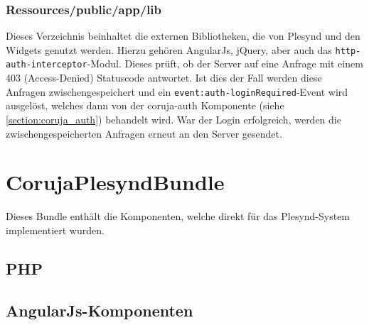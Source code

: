 \subsubsection*{Ressources/public/app/lib}
Dieses Verzeichnis beinhaltet die externen Bibliotheken, die von Plesynd und den Widgets genutzt werden. Hierzu gehören AngularJs, jQuery, aber auch das \texttt{http-auth-interceptor}-Modul. Dieses prüft, ob der Server auf eine Anfrage mit einem 403 (Access-Denied) Statuscode antwortet. Ist dies der Fall werden diese Anfragen zwischengespeichert und ein \texttt{event:auth-loginRequired}-Event wird ausgelöst, welches dann von der coruja-auth Komponente (siehe \ref{section:coruja_auth}) behandelt wird. War der Login erfolgreich, werden die zwischengespeicherten Anfragen erneut an den Server gesendet. 

\section{CorujaPlesyndBundle}
Dieses Bundle enthält die Komponenten, welche direkt für das Plesynd-System implementiert wurden.

\subsection{PHP}

\subsection{AngularJs-Komponenten}

